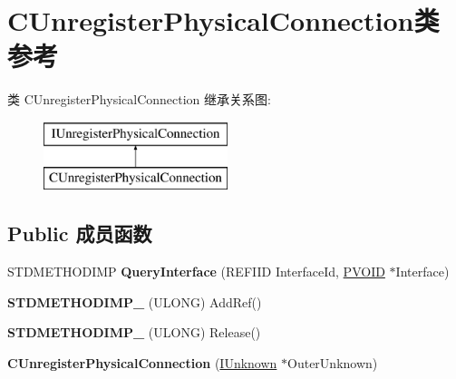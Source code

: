 \hypertarget{class_c_unregister_physical_connection}{}\section{C\+Unregister\+Physical\+Connection类 参考}
\label{class_c_unregister_physical_connection}
类 C\+Unregister\+Physical\+Connection 继承关系图\+:\begin{figure}[H]
\begin{center}
\leavevmode
\includegraphics[height=2.000000cm]{class_c_unregister_physical_connection}
\end{center}
\end{figure}
\subsection*{Public 成员函数}
\begin{DoxyCompactItemize}
\item 
\mbox{\label{class_c_unregister_physical_connection_a7cea6554831a363201b7e10919b0c4c2}} 
S\+T\+D\+M\+E\+T\+H\+O\+D\+I\+MP {\bfseries Query\+Interface} (R\+E\+F\+I\+ID Interface\+Id, \hyperlink{interfacevoid}{P\+V\+O\+ID} $\ast$Interface)
\item 
\mbox{\label{class_c_unregister_physical_connection_a9e9f1d7ac82aa98302828322e0346c4e}} 
{\bfseries S\+T\+D\+M\+E\+T\+H\+O\+D\+I\+M\+P\+\_\+} (U\+L\+O\+NG) Add\+Ref()
\item 
\mbox{\label{class_c_unregister_physical_connection_a09f360316e159f16ad8207dc045da3f3}} 
{\bfseries S\+T\+D\+M\+E\+T\+H\+O\+D\+I\+M\+P\+\_\+} (U\+L\+O\+NG) Release()
\item 
\mbox{\label{class_c_unregister_physical_connection_a77da134e31f361ae2d955e0c5ddfae34}} 
{\bfseries C\+Unregister\+Physical\+Connection} (\hyperlink{interface_i_unknown}{I\+Unknown} $\ast$Outer\+Unknown)
\end{DoxyCompactItemize}
